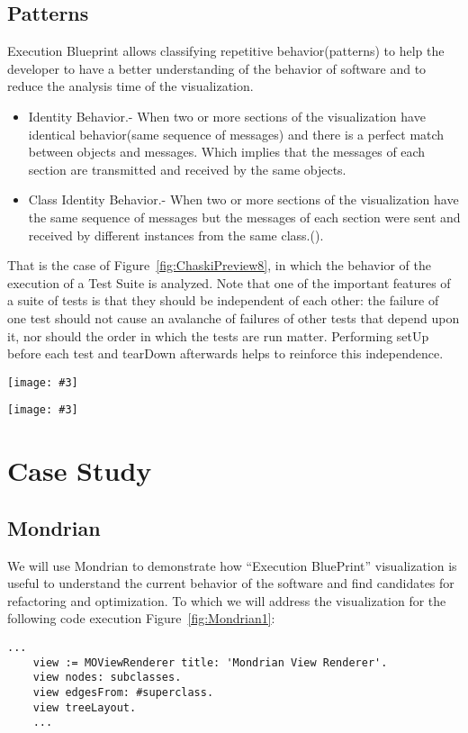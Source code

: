 \documentclass{sig-alternate}
\newcommand{\largefig}[4]{
	\begin{figure*}[#1]
		\centering
		\texttt{[image: \#3]}
		\caption{\label{fig:#3}#4}
	\end{figure*}}
\newcommand{\seclabel}[1]{\label{sec:#1}}
\newcommand{\figref}[1]{Figure~\ref{fig:#1}}
\begin{document}
\subsection{Patterns}

Execution Blueprint allows classifying repetitive behavior(patterns) to help the developer to have a better understanding of the behavior of software and to reduce the analysis time of the visualization.

\begin{itemize}
\item Identity Behavior.- When two or more sections of the visualization have identical behavior(same sequence of messages) and there is a perfect match between objects and messages. Which implies that the messages of each section are transmitted and received by the same objects.
\item Class Identity Behavior.- When two or more sections of the visualization have the same sequence of messages but the messages of each section were sent and received by different instances from the same class.().
\end{itemize}

That is the case of \figref{ChaskiPreview8}, in which the behavior of the execution of a Test Suite is analyzed. Note that one of the important features of a suite of tests is that they should be independent of each other: the failure of one test should not cause an avalanche of failures of other tests that depend upon it, nor should the order in which the tests are run matter. Performing setUp before each test and tearDown afterwards helps to reinforce this independence.


\largefig{}{1.0}{ChaskiPreview11}{Finding patterns in the execution (Glamour)}
\largefig{}{1.0}{ChaskiPreview8}{Visualizing a Test Suite execution (RBSmallDictionaryTest buildSuite run)}
\section{Case Study}\seclabel{case study}

\subsection{Mondrian}

We will use Mondrian to demonstrate how ``Execution BluePrint'' visualization is useful to understand the current behavior of the software and find candidates for refactoring and optimization. To which we will address the visualization for the following code execution \figref{Mondrian1}:
\begin{lstlisting}[language=Smalltalk]
	...
	view := MOViewRenderer title: 'Mondrian View Renderer'.
	view nodes: subclasses.
	view edgesFrom: #superclass.
	view treeLayout.
	...
\end{lstlisting}
\end{document}
